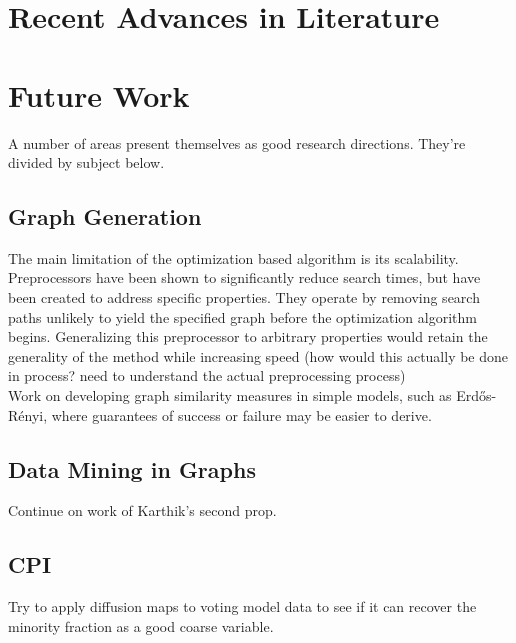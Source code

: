 \documentclass[11pt]{article}
\begin{document}
\section{Recent Advances in Literature}
\section{Future Work}
A number of areas present themselves as good research directions. They're divided by subject below.
\subsection{Graph Generation}
The main limitation of the optimization based algorithm is its scalability. Preprocessors have been shown to significantly reduce search times, but have been created to address specific properties. They operate by removing search paths unlikely to yield the specified graph before the optimization algorithm begins. Generalizing this preprocessor to arbitrary properties would retain the generality of the method while increasing speed (how would this actually be done in process? need to understand the actual preprocessing process)\\
Work on developing graph similarity measures in simple models, such as Erd\H{o}s-R\'{e}nyi, where guarantees of success or failure may be easier to derive.
\subsection{Data Mining in Graphs}
Continue on work of Karthik's second prop.
\subsection{CPI}
Try to apply diffusion maps to voting model data to see if it can recover the minority fraction as a good coarse variable. 

%
%
\end{document}
